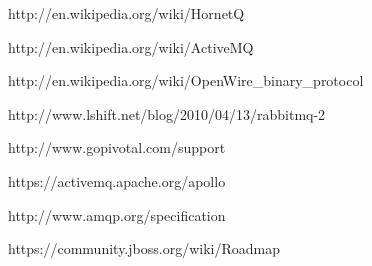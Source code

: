\documentclass{thesis}
\begin{document}
\begin{singlespace}
\begin{thebibliography}{99}
 http://en.wikipedia.org/wiki/HornetQ

 http://en.wikipedia.org/wiki/ActiveMQ

 http://en.wikipedia.org/wiki/OpenWire\_binary\_protocol

 http://www.lshift.net/blog/2010/04/13/rabbitmq-2

 http://www.gopivotal.com/support 

 https://activemq.apache.org/apollo

 http://www.amqp.org/specification

 https://community.jboss.org/wiki/Roadmap

\end{thebibliography}
\end{singlespace}


\appendix    %
\end{document}
